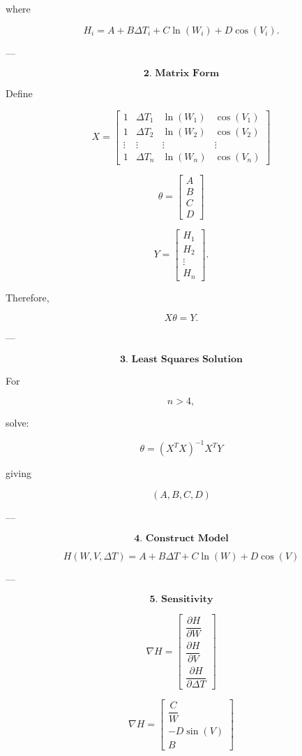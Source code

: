 \documentclass{article}
\begin{document}
where

\[
H_i=A+B\Delta T_i+C\ln(W_i)+D\cos(V_i).
\]

---

\[
\textbf{2. Matrix Form}
\]

Define

\[
X=
\begin{bmatrix}
1&\Delta T_1&\ln(W_1)&\cos(V_1)\\
1&\Delta T_2&\ln(W_2)&\cos(V_2)\\
\vdots&\vdots&\vdots&\vdots\\
1&\Delta T_n&\ln(W_n)&\cos(V_n)
\end{bmatrix}
\]

\[
\theta=
\begin{bmatrix}
A\\B\\C\\D
\end{bmatrix}
\]

\[
Y=
\begin{bmatrix}
H_1\\H_2\\\vdots\\H_n
\end{bmatrix}.
\]

Therefore,

\[
X\theta=Y.
\]

---

\[
\textbf{3. Least Squares Solution}
\]

For

\[
n>4,
\]

solve:

\[
\boxed{
\theta=(X^TX)^{-1}X^TY
}
\]

giving

\[
\boxed{
(A,B,C,D)
}
\]

---

\[
\textbf{4. Construct Model}
\]

\[
\boxed{
H(W,V,\Delta T)
=
A+B\Delta T+C\ln(W)+D\cos(V)
}
\]

---

\[
\textbf{5. Sensitivity}
\]

\[
\nabla H
=
\begin{bmatrix}
\dfrac{\partial H}{\partial W}\\
\dfrac{\partial H}{\partial V}\\
\dfrac{\partial H}{\partial \Delta T}
\end{bmatrix}
\]

\[
\boxed{
\nabla H
=
\begin{bmatrix}
\dfrac{C}{W}\\
-D\sin(V)\\
B
\end{bmatrix}
}
\]
\end{document}
